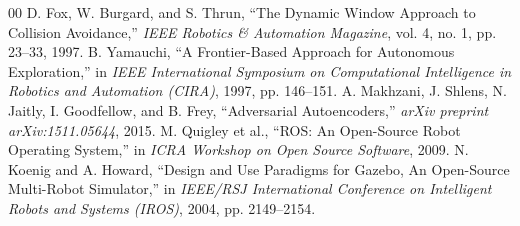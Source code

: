 \documentclass[conference]{IEEEtran}
\begin{document}
\begin{thebibliography}{00}
 D. Fox, W. Burgard, and S. Thrun, ``The Dynamic Window Approach to Collision Avoidance,'' \textit{IEEE Robotics \& Automation Magazine}, vol. 4, no. 1, pp. 23--33, 1997.
 B. Yamauchi, ``A Frontier-Based Approach for Autonomous Exploration,'' in \textit{IEEE International Symposium on Computational Intelligence in Robotics and Automation (CIRA)}, 1997, pp. 146--151.
 A. Makhzani, J. Shlens, N. Jaitly, I. Goodfellow, and B. Frey, ``Adversarial Autoencoders,'' \textit{arXiv preprint arXiv:1511.05644}, 2015.
 M. Quigley et al., ``ROS: An Open-Source Robot Operating System,'' in \textit{ICRA Workshop on Open Source Software}, 2009.
 N. Koenig and A. Howard, ``Design and Use Paradigms for Gazebo, An Open-Source Multi-Robot Simulator,'' in \textit{IEEE/RSJ International Conference on Intelligent Robots and Systems (IROS)}, 2004, pp. 2149--2154.
\end{thebibliography}
\end{document}
